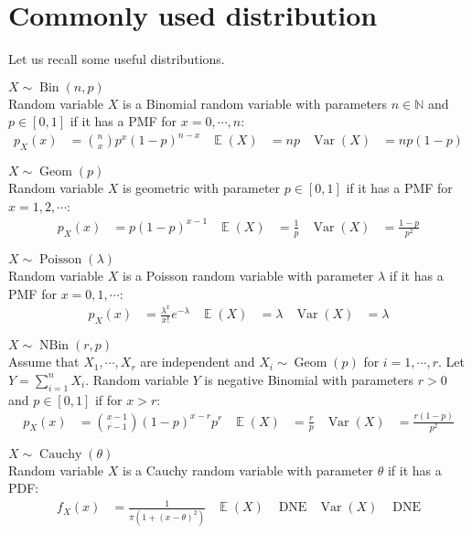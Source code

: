 \documentclass{huhtakm-template-book-v2}
\DeclareMathOperator{\E}{\mathbb{E}}
\DeclareMathOperator{\Var}{Var}
\DeclareMathOperator{\Bin}{Bin}
\DeclareMathOperator{\Geom}{Geom}
\DeclareMathOperator{\Poisson}{Poisson}
\DeclareMathOperator{\Cauchy}{Cauchy}
\DeclareMathOperator{\NBin}{NBin}
\begin{document}
\section{Commonly used distribution}
Let us recall some useful distributions.
\begin{eg} $X\sim\Bin(n,p)$\\
	Random variable $X$ is a Binomial random variable with parameters $n\in\mathbb{N}$ and $p\in[0,1]$ if it has a PMF for $x=0,\cdots,n$:
	\begin{align*}
		p_{X}(x)&=\binom{n}{x}p^{x}(1-p)^{n-x} & \E(X)&=np & \Var(X)&=np(1-p)
	\end{align*}
\end{eg}
\begin{eg} $X\sim\Geom(p)$\\
	Random variable $X$ is geometric with parameter $p\in[0,1]$ if it has a PMF for $x=1,2,\cdots$:
	\begin{align*}
		p_{X}(x)&=p(1-p)^{x-1} & \E(X)&=\frac{1}{p} & \Var(X)&=\frac{1-p}{p^{2}}
	\end{align*}
\end{eg}
\begin{eg} $X\sim\Poisson(\lambda)$\\
	Random variable $X$ is a Poisson random variable with parameter $\lambda$ if it has a PMF for $x=0,1,\cdots$:
	\begin{align*}
		p_{X}(x)&=\frac{\lambda^{x}}{x!}e^{-\lambda} & \E(X)&=\lambda & \Var(X)&=\lambda
	\end{align*}
\end{eg}
\begin{eg} $X\sim\NBin(r,p)$\\
	Assume that $X_{1},\cdots,X_{r}$ are independent and $X_{i}\sim\Geom(p)$ for $i=1,\cdots,r$. Let $Y=\sum_{i=1}^{n}X_{i}$. Random variable $Y$ is negative Binomial with parameters $r>0$ and $p\in[0,1]$ if for $x>r$:
	\begin{align*}
		p_{X}(x)&=\binom{x-1}{r-1}(1-p)^{x-r}p^{r} & \E(X)&=\frac{r}{p} & \Var(X)&=\frac{r(1-p)}{p^{2}}
	\end{align*}
\end{eg}
\begin{eg} $X\sim\Cauchy(\theta)$\\
	Random variable $X$ is a Cauchy random variable with parameter $\theta$ if it has a PDF:
	\begin{align*}
		f_{X}(x)&=\frac{1}{\pi(1+(x-\theta)^{2})} & \E(X)&\text{ DNE} & \Var(X)&\text{ DNE}
	\end{align*}
\end{eg}
\end{document}
